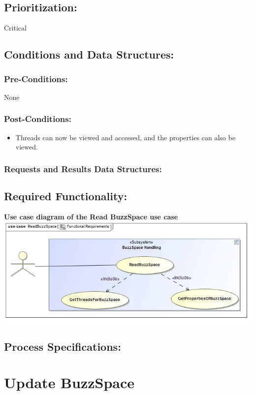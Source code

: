 \documentclass[a4paper,11pt]{article}
\begin{document}
\subsection{Prioritization:} Critical
\subsection{Conditions and Data Structures:}
\subsubsection*{Pre-Conditions:}None 
\subsubsection*{Post-Conditions:}
\begin{itemize}
	\item Threads can now be viewed and accessed, and the properties can also be viewed.
\end{itemize}
\subsubsection*{Requests and Results Data Structures:}
\subsection{Required Functionality:} 
\textbf{Use case diagram of the Read BuzzSpace use case}\\ 
\includegraphics[width=1\linewidth]{./Images/BuzzSpaceHandling/buzzSpaceRead.jpg}\\
\subsection{Process Specifications:} 

\section{Update BuzzSpace}
\end{document}
